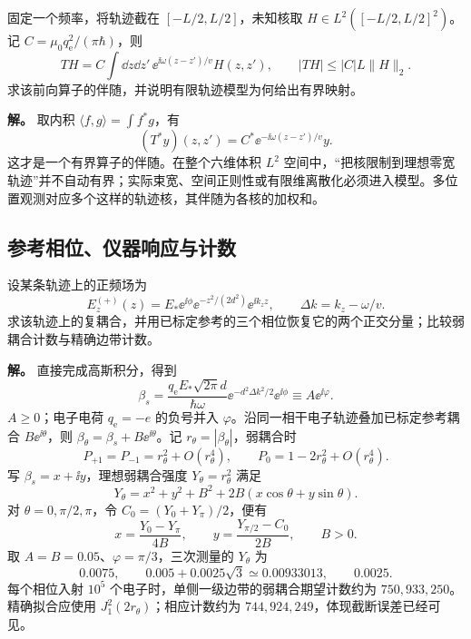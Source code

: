 \begin{workedexample}[有限窗口核的伴随]
固定一个频率，将轨迹截在 $[-L/2,L/2]$，未知核取 $H\in L^2([-L/2,L/2]^2)$。记 $C=\mu_0q_{\mathrm e}^2/(\pi\hbar)$，则
\[
TH=C\int\dd z\dd z'\,\ee^{\ii\omega(z-z')/v}H(z,z'),
\qquad |TH|\le |C|L\|H\|_2.
\]
求该前向算子的伴随，并说明有限轨迹模型为何给出有界映射。

\textbf{解。} 取内积 $\langle f,g\rangle=\int f^*g$，有
\[
(T^*y)(z,z')=C^*\ee^{-\ii\omega(z-z')/v}y.
\]
这才是一个有界算子的伴随。在整个六维体积 $L^2$ 空间中，“把核限制到理想零宽轨迹”并不自动有界；实际束宽、空间正则性或有限维离散化必须进入模型。多位置观测对应多个这样的轨迹核，其伴随为各核的加权和。
\end{workedexample}

\subsection{参考相位、仪器响应与计数}

\begin{workedexample}[高斯近场的三相位复振幅读取]
设某条轨迹上的正频场为
\[
E_z^{(+)}(z)=E_*\ee^{\ii\phi}\ee^{-z^2/(2d^2)}\ee^{\ii k_z z},
\qquad\Delta k=k_z-\omega/v.
\]
求该轨迹上的复耦合，并用已标定参考的三个相位恢复它的两个正交分量；比较弱耦合计数与精确边带计数。

\textbf{解。} 直接完成高斯积分，得到
\begin{equation}
\beta_s=\frac{q_{\mathrm e}E_*\sqrt{2\pi}d}{\hbar\omega}
\ee^{-d^2\Delta k^2/2}\ee^{\ii\phi}
\equiv A\ee^{\ii\varphi}.
\label{eq:feqo-imaging-beta}
\end{equation}
$A\ge0$；电子电荷 $q_{\mathrm e}=-e$ 的负号并入 $\varphi$。沿同一相干电子轨迹叠加已标定参考耦合 $B\ee^{\ii\theta}$，则 $\beta_\theta=\beta_s+B\ee^{\ii\theta}$。记 $r_\theta=|\beta_\theta|$，弱耦合时
\begin{equation}
P_{+1}=P_{-1}=r_\theta^2+O(r_\theta^4),
\qquad P_0=1-2r_\theta^2+O(r_\theta^4).
\label{eq:feqo-imaging-weak-forward}
\end{equation}
写 $\beta_s=x+\ii y$，理想弱耦合强度 $Y_\theta=r_\theta^2$ 满足
\[
Y_\theta=x^2+y^2+B^2+2B(x\cos\theta+y\sin\theta).
\]
对 $\theta=0,\pi/2,\pi$，令 $C_0=(Y_0+Y_\pi)/2$，便有
\[
x=\frac{Y_0-Y_\pi}{4B},\qquad
y=\frac{Y_{\pi/2}-C_0}{2B},\qquad B>0.
\]
取 $A=B=0.05$、$\varphi=\pi/3$，三次测量的 $Y_\theta$ 为
\[
0.0075,\qquad0.005+0.0025\sqrt3\simeq0.00933013,
\qquad0.0025.
\]
每个相位入射 $10^5$ 个电子时，单侧一级边带的弱耦合期望计数约为 $750,933,250$。精确拟合应使用 $J_1^2(2r_\theta)$；相应计数约为 $744,924,249$，体现截断误差已经可见。
\end{workedexample}


